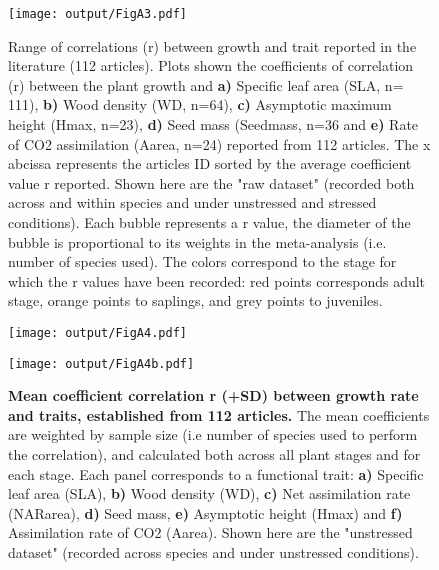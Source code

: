 \documentclass[a4paper]{article}\usepackage[]{graphicx}\usepackage[]{color}
\begin{document}
\begin{appendices}
\begin{figure}[h!]
\centering
\texttt{[image: output/FigA3.pdf]}
\caption{Range of correlations (r) between
growth and trait reported in the literature (112 articles). Plots shown the coefficients of correlation (r)
between the plant growth and \textbf{a)} Specific leaf area (SLA, n=
111), \textbf{b)} Wood density (WD, n=64), \textbf{c)} Asymptotic
maximum height (Hmax, n=23), \textbf{d)} Seed mass (Seedmass, n=36 and
\textbf{e)} Rate of CO2 assimilation (Aarea, n=24) reported from 112
articles. The x abcissa represents the articles ID sorted by the average coefficient value r reported.
Shown here are the "raw dataset" (recorded both across and within species
and under unstressed and stressed conditions). Each bubble represents a r value, the diameter of the bubble
is proportional to its weights in the meta-analysis (i.e. number of species used). The colors
correspond to the stage for which the r values have been recorded: red
points corresponds adult stage, orange points to saplings, and grey
points to juveniles.}
\label{FigA3}
\end{figure}

\begin{figure}[h!]
\centering
\texttt{[image: output/FigA4.pdf]}
\end{figure}

\begin{figure}[h!]
\centering
\texttt{[image: output/FigA4b.pdf]}
\caption{\textbf{Mean coefficient correlation r (+SD) between growth rate and traits, established from 112 articles.} The mean coefficients are weighted by sample size (i.e number of species used to perform the correlation), and calculated both across all plant stages and for each stage. Each panel corresponds to a functional trait: \textbf{a)} Specific leaf area (SLA), \textbf{b)} Wood density (WD), \textbf{c)} Net assimilation rate (NARarea), \textbf{d)} Seed mass, \textbf{e)} Asymptotic height (Hmax) and \textbf{f)} Assimilation rate of CO2 (Aarea). Shown here are the "unstressed dataset" (recorded across species and under unstressed conditions).}
\label{FigA4}
\end{figure}


\end{appendices}
\end{document}
